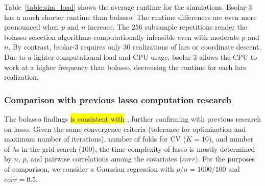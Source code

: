 \documentclass[11pt,review,authoryear]{elsarticle}
\begin{document}
\begin{table}[ht]
%
\centering
%
\caption{Simulation results for computation load (mean runtime in seconds).\label{table:sim_load}}
\smallskip
%
\end{table}

Table~\ref{table:sim_load} shows the average runtime for the simulations. Bsolar-3 has a much shorter runtime than bolasso. The runtime differences are even more pronounced when $p$ and $n$ increase. The 256 subsample repetitions render the bolasso selection algorithms computationally infeasible even with moderate $p$ and $n$. By contrast, bsolar-3 requires only 30 realizations of lars or coordinate descent. Due to a lighter computational load and CPU usage, bsolar-3 allows the CPU to work at a higher frequency than bolasso, decreasing the runtime for each lars realization.

\subsubsection{Comparison with previous lasso computation research}

The bolasso findings \hl{is consistent with} \citet{tibshirani2015general}, further confirming with previous research on lasso. Given the same convergence criteria (tolerance for optimization and maximum number of iterations), number of folds for CV ($K=10$), and number of $\lambda$s in the grid search (100), the time complexity of lasso is mostly determined by $n$, $p$, and pairwise correlations among the covariates ($corr$). For the purposes of comparison, we consider a Gaussian regression with $p/n=1000/100$ and $corr=0.5$.
\end{document}
